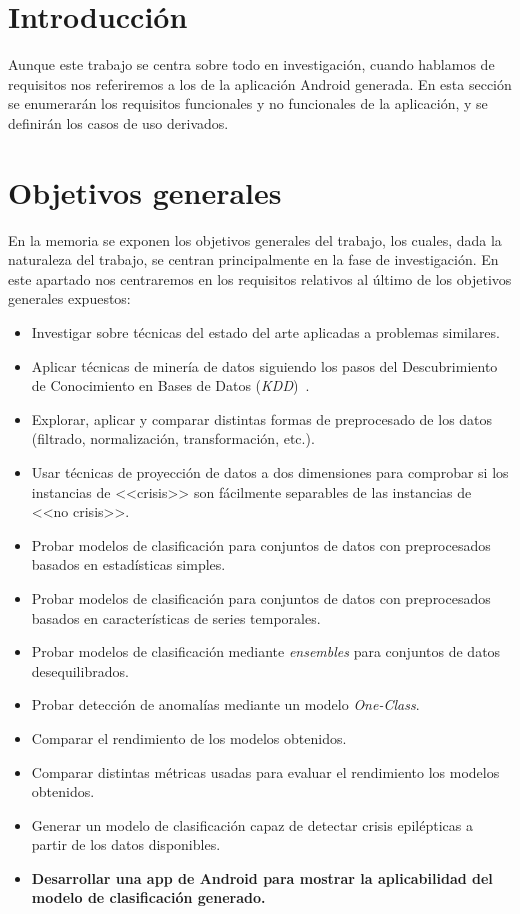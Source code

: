 
\section{Introducción}

Aunque este trabajo se centra sobre todo en investigación, cuando hablamos de requisitos nos referiremos a los de la aplicación Android generada. En esta sección se enumerarán los requisitos funcionales y no funcionales de la aplicación, y se definirán los casos de uso derivados.  

\section{Objetivos generales}

En la memoria se exponen los objetivos generales del trabajo, los cuales, dada la naturaleza del trabajo, se centran principalmente en la fase de investigación. En este apartado nos centraremos en los requisitos relativos al último de los objetivos generales expuestos: 

\begin{itemize}
	\item Investigar sobre técnicas del estado del arte aplicadas a problemas similares. 
	\item Aplicar técnicas de minería de datos siguiendo los pasos del Descubrimiento de Conocimiento en Bases de Datos (\textit{KDD})~\cite{fayyad1996data}.
	\item Explorar, aplicar y comparar distintas formas de preprocesado de los datos (filtrado, normalización, transformación, etc.). 
	\item Usar técnicas de proyección de datos a dos dimensiones para comprobar si los instancias de <<crisis>> son fácilmente separables de las instancias de <<no crisis>>. 
	\item Probar modelos de clasificación para conjuntos de datos con preprocesados basados en estadísticas simples.
	\item Probar modelos de clasificación para conjuntos de datos con preprocesados basados en características de series temporales.  
	\item Probar modelos de clasificación mediante \textit{ensembles} para conjuntos de datos desequilibrados. 
	\item Probar detección de anomalías mediante un modelo \textit{One-Class}.
	\item Comparar el rendimiento de los modelos obtenidos. 
	\item Comparar distintas métricas usadas para evaluar el rendimiento los modelos obtenidos. 
	\item Generar un modelo de clasificación capaz de detectar crisis epilépticas a partir de los datos disponibles. 
	\item \textbf{Desarrollar una app de Android para mostrar la aplicabilidad del modelo de clasificación generado.} 
\end{itemize}

